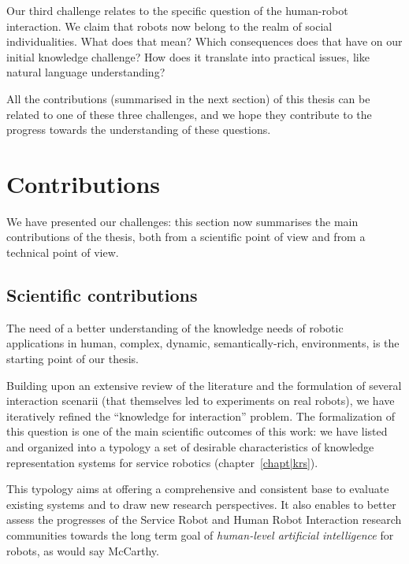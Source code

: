 Our third challenge relates to the specific question of the human-robot
interaction. We claim that robots now belong to the realm of social
individualities. What does that mean? Which consequences does that have on our
initial knowledge challenge? How does it translate into practical issues, like
natural language understanding?

All the contributions (summarised in the next section) of this thesis can be
related to one of these three challenges, and we hope they contribute to the
progress towards the understanding of these questions.



\section{Contributions}
\label{sect|contributions}

We have presented our challenges: this section now summarises the main
contributions of the thesis, both from a scientific point of view and from a
technical point of view.

\subsection{Scientific contributions}
\label{sect|scientific-contributions}

The need of a better understanding of the knowledge needs of robotic
applications in human, \ie complex, dynamic, semantically-rich, environments,
is the starting point of our thesis.

Building upon an extensive review of the literature and the formulation of
several interaction scenarii (that themselves led to experiments on real
robots), we have iteratively refined the ``knowledge for interaction'' problem.
The formalization of this question is one of the main scientific outcomes of
this work: we have listed and organized into a typology a set of desirable
characteristics of knowledge representation systems for service robotics
(chapter~\ref{chapt|krs}).

This typology aims at offering a comprehensive and consistent base to evaluate
existing systems and to draw new research perspectives. It also enables to
better assess the progresses of the Service Robot and Human Robot Interaction
research communities towards the long term goal of \emph{human-level artificial
intelligence} for robots, as would say McCarthy.

